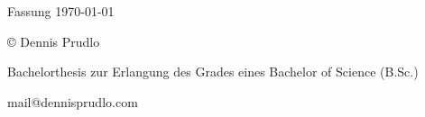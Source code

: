 \maketitle
\pagestyle{empty}

Fassung \today
\mbox{}\vfill
\footnotesize{%
	© \the\year{} Dennis Prudlo\par
	Bachelorthesis zur Erlangung des Grades eines Bachelor of Science (B.Sc.)\par
	mail@dennisprudlo.com
}
\restoregeometry
\clearpage
